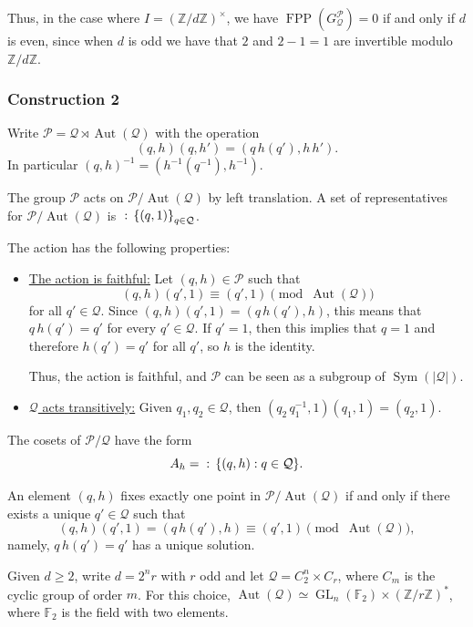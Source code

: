 \documentclass{amsart}
\def\set#1{{\def\st{\;:\;}\left\{#1\right\}}}
\def\abs#1{\left\vert{#1}\right\vert}
\def\ZZ{\mathbb Z}
\def\FF{\mathbb F}
\DeclareMathOperator{\Aut}{Aut}
\DeclareMathOperator{\FPP}{FPP}
\DeclareMathOperator{\Sym}{Sym}
\DeclareMathOperator{\st}{st}
\DeclareMathOperator{\GL}{GL}
\begin{document}
Thus, in the case where $I = (\ZZ/d\ZZ)^\times$, we have $\FPP(G_\mathcal{Q}^\mathcal{P}) = 0$ if and only if $d$ is even, since when $d$ is odd we have that $2$ and $2 -1 = 1$ are invertible modulo $\ZZ/d\ZZ$. 

\subsubsection{Construction 2}

Write $\mathcal{P} = \mathcal{Q} \rtimes \Aut(\mathcal{Q})$ with the operation $$(q,h)(q,h') = (q \, h(q'),h \, h').$$ In particular $(q,h)^{-1} = (h^{-1}(q^{-1}), h^{-1})$.

The group $\mathcal{P}$ acts on $\mathcal{P}/\Aut(\mathcal{Q})$ by left translation. A set of representatives for $\mathcal{P}/\Aut(\mathcal{Q})$ is $\set{(q,1)}_{q \in \mathcal{Q}}$.

\bigskip

The action has the following properties:

\begin{itemize}
\item \underline{The action is faithful:} Let $(q,h) \in \mathcal{P}$ such that $$(q,h)(q',1) \equiv (q',1) \pmod{\Aut(\mathcal{Q})}$$ for all $q' \in \mathcal{Q}$. Since $(q,h)(q',1) = (q \, h(q'), h)$, this means that $q \, h(q') = q'$ for every $q' \in \mathcal{Q}$. If $q' = 1$, then this implies that $q = 1$ and therefore $h(q') = q'$ for all $q'$, so $h$ is the identity. 

Thus, the action is faithful, and $\mathcal{P}$ can be seen as a subgroup of $\Sym(\abs{\mathcal{Q}})$. 

\item \underline{$\mathcal{Q}$ acts transitively:} Given $q_1,q_2 \in \mathcal{Q}$, then $(q_2 \, q_1^{-1},1) (q_1,1) = (q_2,1)$. 
\end{itemize}

\bigskip

The cosets of $\mathcal{P}/\mathcal{Q}$ have the form $$A_h = \set{(q,h): q \in \mathcal{Q}}.$$

An element $(q,h)$ fixes exactly one point in $\mathcal{P}/\Aut(\mathcal{Q})$ if and only if there exists a unique $q' \in \mathcal{Q}$ such that $$(q,h) (q',1) = (q \, h(q'), h) \equiv (q',1) \pmod{\Aut(\mathcal{Q})},$$ namely, $q \, h(q') = q'$ has a unique solution.

Given $d \geq 2$, write $d = 2^n r$ with $r$ odd and let $\mathcal{Q} = C_2^{n} \times C_r$, where $C_m$ is the cyclic group of order $m$. For this choice, $\Aut(\mathcal{Q}) \simeq \GL_n(\FF_2) \times (\ZZ/r\ZZ)^*$, where $\FF_2$ is the field with two elements.  
\end{document}
